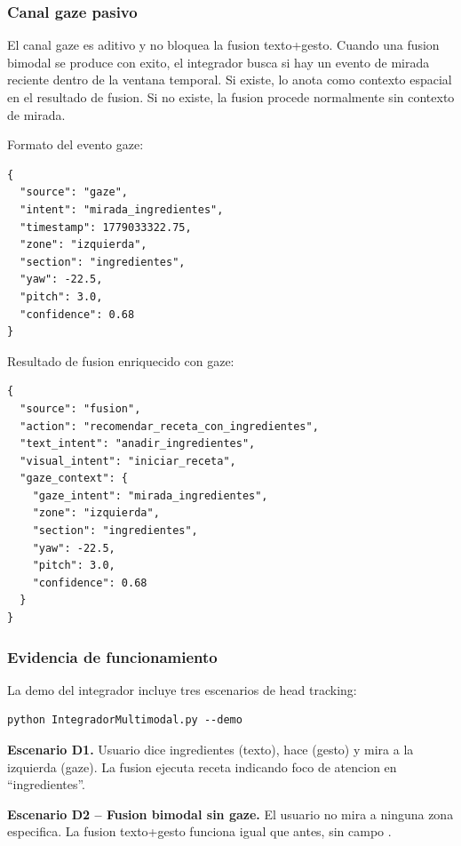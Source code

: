 \documentclass[12pt,a4paper]{article}
\newcommand{\codepath}[1]{\texttt{\detokenize{#1}}}
\begin{document}
\subsubsection{Canal gaze pasivo}

El canal gaze es aditivo y no bloquea la fusion texto+gesto. Cuando una fusion bimodal se produce con exito, el integrador busca si hay un evento de mirada reciente dentro de la ventana temporal. Si existe, lo anota como contexto espacial en el resultado de fusion. Si no existe, la fusion procede normalmente sin contexto de mirada.

Formato del evento gaze:

\begin{lstlisting}[caption={Ejemplo de evento gaze publicado por el head tracker.}]
{
  "source": "gaze",
  "intent": "mirada_ingredientes",
  "timestamp": 1779033322.75,
  "zone": "izquierda",
  "section": "ingredientes",
  "yaw": -22.5,
  "pitch": 3.0,
  "confidence": 0.68
}
\end{lstlisting}

Resultado de fusion enriquecido con gaze:

\begin{lstlisting}[caption={Fusion trimodal con contexto de mirada.}]
{
  "source": "fusion",
  "action": "recomendar_receta_con_ingredientes",
  "text_intent": "anadir_ingredientes",
  "visual_intent": "iniciar_receta",
  "gaze_context": {
    "gaze_intent": "mirada_ingredientes",
    "zone": "izquierda",
    "section": "ingredientes",
    "yaw": -22.5,
    "pitch": 3.0,
    "confidence": 0.68
  }
}
\end{lstlisting}

\subsubsection{Evidencia de funcionamiento}

La demo del integrador incluye tres escenarios de head tracking:

\begin{lstlisting}[caption={Demo de head tracking.}]
python IntegradorMultimodal.py --demo
\end{lstlisting}

\textbf{Escenario D1.} Usuario dice ingredientes (texto), hace \codepath{pizca_sal} (gesto) y mira a la izquierda (gaze). La fusion ejecuta receta indicando foco de atencion en ``ingredientes''.

\textbf{Escenario D2 -- Fusion bimodal sin gaze.} El usuario no mira a ninguna zona especifica. La fusion texto+gesto funciona igual que antes, sin campo \codepath{gaze_context}.
\end{document}
